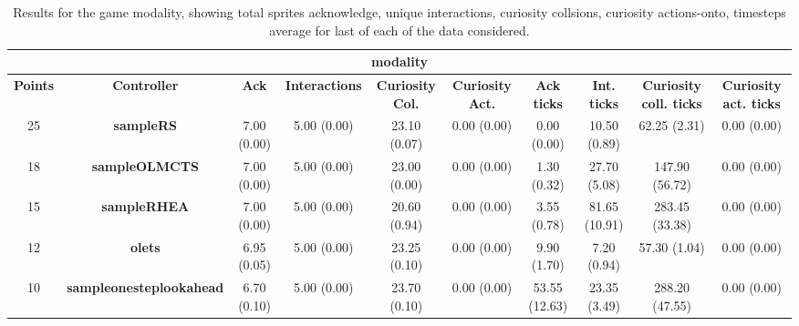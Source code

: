\begin{table*}[!t]
\begin{center}
\begin{adjustbox}{width=1\textwidth}
\begin{tabular}{|c|c|c|c|c|c|c|c|c|c|}
\multicolumn{10}{c}{\textbf{modality}}\\
\hline
\textbf{Points} & \textbf{Controller} & \textbf{Ack} & \textbf{Interactions} & \textbf{Curiosity Col.} & \textbf{Curiosity Act.} & \textbf{Ack ticks} & \textbf{Int. ticks} & \textbf{Curiosity coll. ticks} & \textbf{Curiosity act. ticks}\\
\hline
25 & \textbf{sampleRS} & 7.00 (0.00) & 5.00 (0.00) & 23.10 (0.07) & 0.00 (0.00) & 0.00 (0.00) & 10.50 (0.89) & 62.25 (2.31) & 0.00 (0.00)
 \\
\hline
18 & \textbf{sampleOLMCTS} & 7.00 (0.00) & 5.00 (0.00) & 23.00 (0.00) & 0.00 (0.00) & 1.30 (0.32) & 27.70 (5.08) & 147.90 (56.72) & 0.00 (0.00)
 \\
\hline
15 & \textbf{sampleRHEA} & 7.00 (0.00) & 5.00 (0.00) & 20.60 (0.94) & 0.00 (0.00) & 3.55 (0.78) & 81.65 (10.91) & 283.45 (33.38) & 0.00 (0.00)
 \\
\hline
12 & \textbf{olets} & 6.95 (0.05) & 5.00 (0.00) & 23.25 (0.10) & 0.00 (0.00) & 9.90 (1.70) & 7.20 (0.94) & 57.30 (1.04) & 0.00 (0.00)
 \\
\hline
10 & \textbf{sampleonesteplookahead} & 6.70 (0.10) & 5.00 (0.00) & 23.70 (0.10) & 0.00 (0.00) & 53.55 (12.63) & 23.35 (3.49) & 288.20 (47.55) & 0.00 (0.00)
 \\
\hline
\end{tabular}
\end{adjustbox}
\caption{Results for the game modality, showing total sprites acknowledge, unique interactions, curiosity collsions, curiosity actions-onto, timesteps average for last of each of the data considered.}
\label{tab:weights}
\end{center}
\end{table*}
